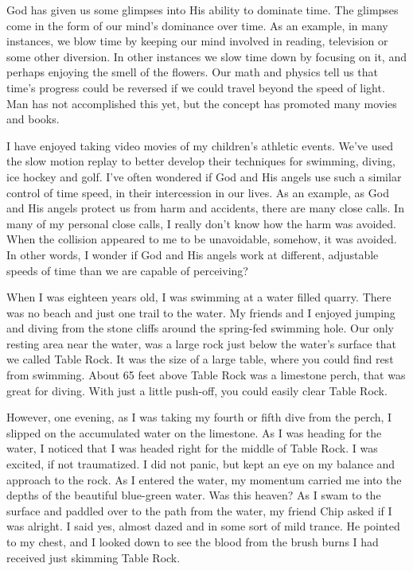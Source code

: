 \documentclass[12pt]{memoir}
\begin{document}
God has given us some glimpses into His ability to dominate time.
The glimpses come in the form of our mind's dominance over time. As
an example, in many instances, we blow time by keeping our mind
involved in reading, television or some other diversion. In other
instances we slow time down by focusing on it, and perhaps enjoying
the smell of the flowers. Our math and physics tell us that time's progress could be reversed if we could travel beyond the speed of light. Man has not accomplished this yet, but the concept has promoted many movies and books.  

I have enjoyed taking video movies of my children's athletic events.
We've used the slow motion replay to better develop their techniques
for swimming, diving, ice hockey and golf. I've often wondered if
God and His angels use such a similar control of time speed, in their
intercession in our lives. As an example, as God and His angels protect us from harm and accidents, there are many close calls. In many
of my personal close calls, I really don't know how the harm
was avoided. When the collision appeared to me to be unavoidable, somehow, it was avoided. In other words, I wonder if God and His angels work at different, adjustable speeds of time than we are capable of perceiving? 

When I was eighteen years old, I was swimming at a water filled quarry.
There was no beach and just one trail to the water. My friends and I enjoyed jumping and diving from the stone cliffs around the spring-fed swimming hole. Our only resting area near the water, was a large rock
just below the water's surface that we called Table Rock. It was the
size of a large table, where you could find rest from swimming. About
65 feet above Table Rock was a limestone perch, that was great for
diving. With just a little push-off, you could easily clear Table
Rock. 

However, one evening, as I was taking my fourth or fifth dive from
the perch, I slipped on the accumulated water on the limestone. As
I was heading for the water, I noticed that I was headed right for
the middle of Table Rock. I was excited, if not traumatized.
I did not panic, but kept an eye on my balance and approach to the
rock. As I entered the water, my momentum carried me into the depths
of the beautiful blue-green water. Was this heaven? As I swam to the surface and paddled over to the path from the water, my friend Chip
asked if I was alright. I said yes, almost dazed and in some sort
of mild trance. He pointed to my chest, and I looked down to see the
blood from the brush burns I had received just skimming Table Rock. 
\end{document}
